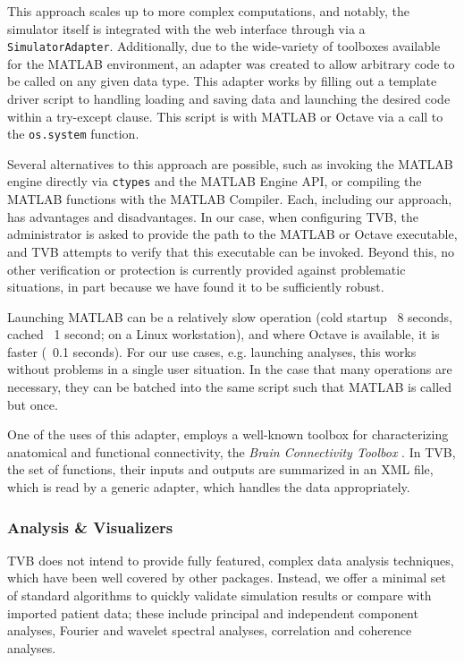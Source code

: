 \documentclass{bioinfo}
\begin{document}
This approach scales up to more complex computations, and notably, the
simulator itself is integrated with the web interface through via a
\texttt{SimulatorAdapter}. Additionally, due to the wide-variety of toolboxes available 
for the MATLAB environment, an adapter was created to allow arbitrary code
to be called on any given data type. This adapter works by filling out
a template driver script to handling loading and saving data and launching
the desired code within a try-except clause. This script is with MATLAB or
Octave via a call to the \texttt{os.system} function.

Several alternatives to this approach are possible, such as invoking the MATLAB
engine directly via \texttt{ctypes} and the MATLAB Engine API, or compiling the MATLAB
functions with the MATLAB Compiler. Each, including our approach, has advantages 
and disadvantages. In our case, when configuring TVB, the administrator is asked
to provide the path to the MATLAB or Octave executable, and TVB attempts to 
verify that this executable can be invoked. Beyond this, no other verification 
or protection is currently provided against problematic situations, in part
because we have found it to be sufficiently robust. 

Launching MATLAB can be a relatively slow operation (cold startup ~8 seconds,
cached ~1 second; on a Linux workstation), and where Octave is available, it is
faster (~0.1 seconds). For our use cases, e.g. launching analyses, this works
without problems in a single user situation. In the case that many operations
are necessary, they can be batched into the same script such that MATLAB is
called but once.

One of the uses of this adapter, employs a well-known toolbox for
characterizing anatomical and functional connectivity, the \emph{Brain
Connectivity Toolbox} \citep{Rubinov_2010}.  In TVB, the set of functions,
their inputs and outputs are summarized in an XML file, which is read by a
generic adapter, which handles the data appropriately.

\subsubsection{Analysis \& Visualizers}

TVB does not intend to provide fully featured, complex data analysis
techniques, which have been well covered by other packages. 
Instead, we offer a minimal set of standard algorithms to quickly
validate simulation results or compare with imported patient data; 
these include principal and independent component analyses, 
Fourier and wavelet spectral analyses, correlation and coherence
analyses.
\end{document}
